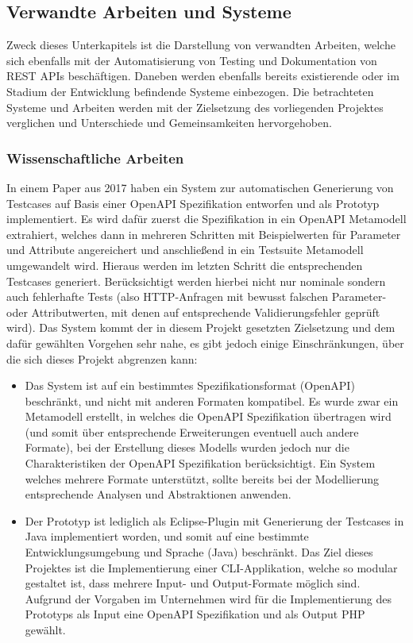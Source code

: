 \newpage

\subsection{Verwandte Arbeiten und Systeme}

Zweck dieses Unterkapitels ist die Darstellung von verwandten Arbeiten, welche sich ebenfalls mit der Automatisierung von Testing und Dokumentation von REST APIs beschäftigen. Daneben werden ebenfalls bereits existierende oder im Stadium der Entwicklung befindende Systeme einbezogen. Die betrachteten Systeme und Arbeiten werden mit der Zielsetzung des vorliegenden Projektes verglichen und Unterschiede und Gemeinsamkeiten hervorgehoben.

\subsubsection{Wissenschaftliche Arbeiten}

In einem Paper aus 2017 haben \textcite{ed2018automatic} ein System zur automatischen Generierung von Testcases auf Basis einer OpenAPI Spezifikation entworfen und als Prototyp implementiert. Es wird dafür zuerst die Spezifikation in ein OpenAPI Metamodell extrahiert, welches dann in mehreren Schritten mit Beispielwerten für Parameter und Attribute angereichert und anschließend in ein Testsuite Metamodell umgewandelt wird. Hieraus werden im letzten Schritt die entsprechenden Testcases generiert. Berücksichtigt werden hierbei nicht nur nominale sondern auch fehlerhafte Tests (also HTTP-Anfragen mit bewusst falschen Parameter- oder Attributwerten, mit denen auf entsprechende Validierungsfehler geprüft wird). Das System kommt der in diesem Projekt gesetzten Zielsetzung und dem dafür gewählten Vorgehen sehr nahe, es gibt jedoch einige Einschränkungen, über die sich dieses Projekt abgrenzen kann:
	\begin{itemize}
		\item Das System ist auf ein bestimmtes Spezifikationsformat (OpenAPI) beschränkt, und nicht mit anderen Formaten kompatibel. Es wurde zwar ein Metamodell erstellt, in welches die OpenAPI Spezifikation übertragen wird (und somit über entsprechende Erweiterungen eventuell auch andere Formate), bei der Erstellung dieses Modells wurden jedoch nur die Charakteristiken der OpenAPI Spezifikation berücksichtigt. Ein System welches mehrere Formate unterstützt, sollte bereits bei der Modellierung entsprechende Analysen und Abstraktionen anwenden.
		\item Der Prototyp ist lediglich als Eclipse-Plugin mit Generierung der Testcases in Java implementiert worden, und somit auf eine bestimmte Entwicklungsumgebung und Sprache (Java) beschränkt. Das Ziel dieses Projektes ist die Implementierung einer CLI-Applikation, welche so modular gestaltet ist, dass mehrere Input- und Output-Formate möglich sind. Aufgrund der Vorgaben im Unternehmen wird für die Implementierung des Prototyps als Input eine OpenAPI Spezifikation und als Output PHP gewählt.
	\end{itemize}
	

